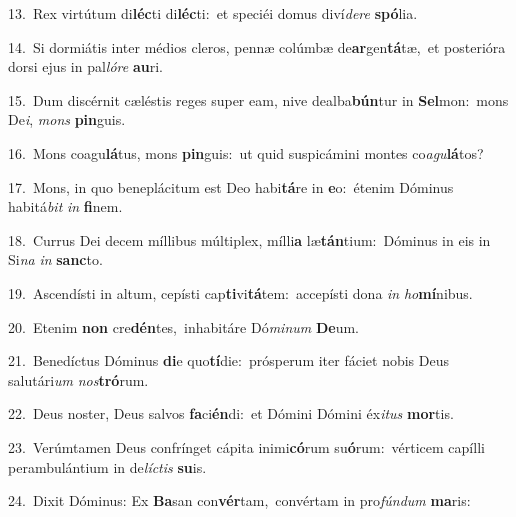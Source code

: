 {\numbfont\textcolor{\numbcolor}{13.}}~Rex virtútum di\-\textbf{léc}\-ti di\-\textbf{léc}\-ti:~\star et speciéi domus diví\-\textit{de}\-\textit{re} \textbf{spó}\-lia.\par
{\numbfont\textcolor{\numbcolor}{14.}}~Si dormiátis inter médios cleros, pennæ colúmbæ de\-\textbf{ar}\-gen\-\textbf{tá}\-tæ,~\star et posterióra dorsi ejus in pal\-\textit{ló}\-\textit{re} \textbf{au}\-ri.\par
{\numbfont\textcolor{\numbcolor}{15.}}~Dum discérnit cæléstis reges super eam, nive dealba\-\textbf{bún}\-tur in \textbf{Sel}\-mon:~\star mons De\-\textit{i}\-, \textit{mons} \textbf{pin}\-guis.\par
{\numbfont\textcolor{\numbcolor}{16.}}~Mons coagu\-\textbf{lá}\-tus, mons \textbf{pin}\-guis:~\star ut quid suspicámini montes co\-\textit{a}\-\textit{gu}\textbf{lá}tos?\par
{\numbfont\textcolor{\numbcolor}{17.}}~Mons, in quo beneplácitum est Deo habi\-\textbf{tá}\-re in \textbf{e}\-o:~\star étenim Dóminus habitá\textit{bit} \textit{in} \textbf{fi}\-nem.\par
{\numbfont\textcolor{\numbcolor}{18.}}~Currus Dei decem míllibus múltiplex, mílli\textbf{a} læ\-\textbf{tán}\-tium:~\star Dóminus in eis in Si\textit{na} \textit{in} \textbf{sanc}\-to.\par
{\numbfont\textcolor{\numbcolor}{19.}}~Ascendísti in altum, cepísti cap\-\textbf{ti}\-vi\-\textbf{tá}\-tem:~\star accepísti dona \textit{in} \textit{ho}\-\textbf{mí}nibus.\par
{\numbfont\textcolor{\numbcolor}{20.}}~Etenim \textbf{non} cre\-\textbf{dén}\-tes,~\star inhabitáre Dó\-\textit{mi}\-\textit{num} \textbf{De}\-um.\par
{\numbfont\textcolor{\numbcolor}{21.}}~Benedíctus Dóminus \textbf{di}\-e quo\-\textbf{tí}\-die:~\star prósperum iter fáciet nobis Deus salutári\textit{um} \textit{nos}\-\textbf{tró}rum.\par
{\numbfont\textcolor{\numbcolor}{22.}}~Deus noster, Deus salvos \textbf{fa}\-ci\-\textbf{én}\-di:~\star et Dómini Dómini éx\-\textit{i}\-\textit{tus} \textbf{mor}\-tis.\par
{\numbfont\textcolor{\numbcolor}{23.}}~Verúmtamen Deus confrínget cápita inimi\-\textbf{có}\-rum su\-\textbf{ó}\-rum:~\star vérticem capílli perambulántium in de\-\textit{líc}\-\textit{tis} \textbf{su}\-is.\par
{\numbfont\textcolor{\numbcolor}{24.}}~Dixit Dóminus: Ex \textbf{Ba}\-san con\-\textbf{vér}\-tam,~\star convértam in pro\-\textit{fún}\-\textit{dum} \textbf{ma}\-ris:\par
